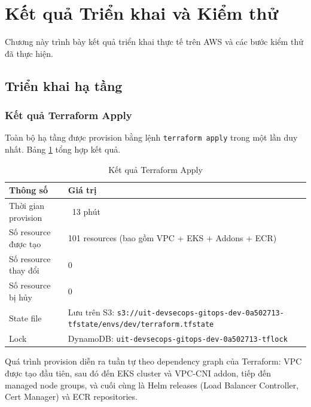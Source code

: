 \documentclass[13pt,a4paper,twoside]{extarticle}
\begin{document}
\newpage

\section{Kết quả Triển khai và Kiểm thử}

Chương này trình bày kết quả triển khai thực tế trên AWS và các bước kiểm thử đã thực hiện.

\subsection{Triển khai hạ tầng}

\subsubsection{Kết quả Terraform Apply}

Toàn bộ hạ tầng được provision bằng lệnh \texttt{terraform apply} trong một lần duy nhất. Bảng \ref{tab:tf-results} tổng hợp kết quả.

\begin{table}[H]
\centering
\begin{tabular}{@{}p{5cm} p{10cm}@{}}
\toprule
\textbf{Thông số} & \textbf{Giá trị} \\
\midrule
Thời gian provision & ~13 phút \\
Số resource được tạo & 101 resources (bao gồm VPC + EKS + Addons + ECR) \\
Số resource thay đổi & 0 \\
Số resource bị hủy & 0 \\
State file & Lưu trên S3: \texttt{s3://uit-devsecops-gitops-dev-0a502713-tfstate/envs/dev/terraform.tfstate} \\
Lock & DynamoDB: \texttt{uit-devsecops-gitops-dev-0a502713-tflock} \\
\bottomrule
\end{tabular}
\caption{Kết quả Terraform Apply}
\label{tab:tf-results}
\end{table}

Quá trình provision diễn ra tuần tự theo dependency graph của Terraform: VPC được tạo đầu tiên, sau đó đến EKS cluster và VPC-CNI addon, tiếp đến managed node groups, và cuối cùng là Helm releases (Load Balancer Controller, Cert Manager) và ECR repositories.
\end{document}
